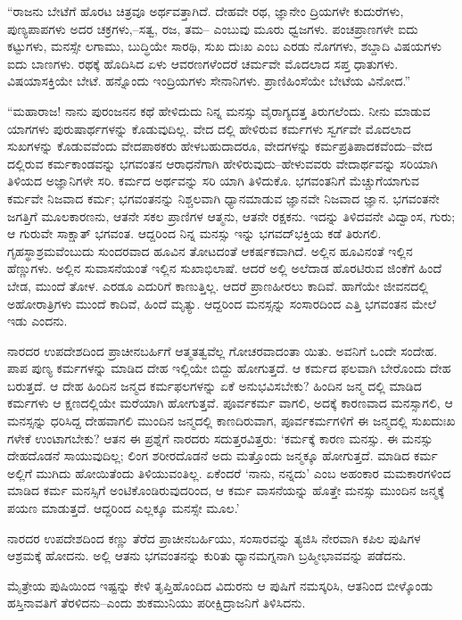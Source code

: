 “ರಾಜನು ಬೇಟೆಗೆ ಹೊರಟ ಚಿತ್ರವೂ ಅರ್ಥವತ್ತಾಗಿದೆ. ದೇಹವೇ ರಥ, ಜ್ಞಾನೇಂ ದ್ರಿಯಗಳೇ ಕುದುರೆಗಳು, ಪುಣ್ಯಪಾಪಗಳು ಅದರ ಚಕ್ರಗಳು,–ಸತ್ವ, ರಜ, ತಮ– ಎಂಬುವು ಮೂರು ಧ್ವಜಗಳು. ಪಂಚಪ್ರಾಣಗಳೇ ಐದು ಕಟ್ಟುಗಳು, ಮನಸ್ಸೇ ಲಗಾಮು, ಬುದ್ಧಿಯೇ ಸಾರಥಿ, ಸುಖ ದುಃಖ ಎಂಬ ಎರಡು ನೊಗಗಳು, ಶಬ್ದಾದಿ ವಿಷಯಗಳು ಐದು ಬಾಣಗಳು. ರಥಕ್ಕೆ ಹೊದಿಸಿದ ಏಳು ಆವರಣಗಳೆಂದರೆ ಚರ್ಮವೇ ಮೊದಲಾದ ಸಪ್ತ ಧಾತುಗಳು. ವಿಷಯಾಸಕ್ತಿಯೇ ಬೇಟೆ. ಹನ್ನೊಂದು ಇಂದ್ರಿಯಗಳು ಸೇನಾನಿಗಳು. ಪ್ರಾಣಿಹಿಂಸೆಯೇ ಬೇಟೆಯ ವಿನೋದ.”

“ಮಹಾರಾಜ! ನಾನು ಪುರಂಜನನ ಕಥೆ ಹೇಳಿದುದು ನಿನ್ನ ಮನಸ್ಸು ವೈರಾಗ್ಯದತ್ತ ತಿರುಗಲೆಂದು. ನೀನು ಮಾಡುವ ಯಾಗಗಳು ಪುರುಷಾರ್ಥಗಳನ್ನು ಕೊಡುವುದಿಲ್ಲ. ವೇದ ದಲ್ಲಿ ಹೇಳಿರುವ ಕರ್ಮಗಳು ಸ್ವರ್ಗವೇ ಮೊದಲಾದ ಸುಖಗಳನ್ನು ಕೊಡುವವೆಂದು ವೇದಪಾಠಕರು ಹೇಳಬಹುದಾದರೂ, ವೇದಗಳನ್ನು ಕರ್ಮಪ್ರತಿಪಾದಕವೆಂದು–ವೇದ ದಲ್ಲಿರುವ ಕರ್ಮಕಾಂಡವನ್ನು ಭಗವಂತನ ಆರಾಧನೆಗಾಗಿ ಹೇಳಿರುವುದು–ಹೇಳುವವರು ವೇದಾರ್ಥವನ್ನು ಸರಿಯಾಗಿ ತಿಳಿಯದ ಅಜ್ಞಾನಿಗಳೇ ಸರಿ. ಕರ್ಮದ ಅರ್ಥವನ್ನು ಸರಿ ಯಾಗಿ ತಿಳಿದುಕೊ. ಭಗವಂತನಿಗೆ ಮೆಚ್ಚುಗೆಯಾಗುವ ಕರ್ಮವೇ ನಿಜವಾದ ಕರ್ಮ; ಭಗವಂತನನ್ನು ನಿಶ್ಚಲವಾಗಿ ಧ್ಯಾನಮಾಡುವ ಜ್ಞಾನವೇ ನಿಜವಾದ ಜ್ಞಾನ. ಭಗವಂತನೇ ಜಗತ್ತಿಗೆ ಮೂಲಕಾರಣನು, ಆತನೇ ಸಕಲ ಪ್ರಾಣಿಗಳ ಆತ್ಮನು, ಆತನೇ ರಕ್ಷಕನು. ಇದನ್ನು ತಿಳಿದವನೇ ವಿದ್ವಾಂಸ, ಗುರು; ಆ ಗುರುವೇ ಸಾಕ್ಷಾತ್ ಭಗವಂತ. ಆದ್ದರಿಂದ ನಿನ್ನ ಮನಸ್ಸು ಇನ್ನು ಭಗವದ್​ಭಕ್ತಿಯ ಕಡೆ ತಿರುಗಲಿ. ಗೃಹಸ್ಥಾಶ್ರಮವೆಂಬುದು ಸುಂದರವಾದ ಹೂವಿನ ತೋಟದಂತೆ ಆಕರ್ಷಕವಾಗಿದೆ. ಅಲ್ಲಿನ ಹೂವಿನಂತೆ ಇಲ್ಲಿನ ಹೆಣ್ಣುಗಳು. ಅಲ್ಲಿನ ಸುವಾಸನೆಯಂತೆ ಇಲ್ಲಿನ ಸುಖಾಭಿಲಾಷೆ. ಆದರೆ ಅಲ್ಲಿ ಅಲೆದಾಡ ಹೊರಟಿರುವ ಜಿಂಕೆಗೆ ಹಿಂದೆ ಬೇಡ, ಮುಂದೆ ತೋಳ. ಎರಡೂ ಎದುರಿಗೆ ಕಾಣುತ್ತಿಲ್ಲ. ಆದರೆ ಪ್ರಾಣಹೀರಲು ಕಾದಿವೆ. ಹಾಗೆಯೇ ಜೀವನದಲ್ಲಿ ಅಹೋರಾತ್ರಿಗಳು ಮುಂದೆ ಕಾದಿವೆ, ಹಿಂದೆ ಮೃತ್ಯು. ಆದ್ದರಿಂದ ಮನಸ್ಸನ್ನು ಸಂಸಾರದಿಂದ ಎತ್ತಿ ಭಗವಂತನ ಮೇಲೆ ಇಡು ಎಂದನು.

ನಾರದರ ಉಪದೇಶದಿಂದ ಪ್ರಾಚೀನಬರ್ಹಿಗೆ ಆತ್ಮತತ್ವವೆಲ್ಲ ಗೋಚರವಾದಂತಾ ಯಿತು. ಅವನಿಗೆ ಒಂದೇ ಸಂದೇಹ. ಪಾಪ ಪುಣ್ಯ ಕರ್ಮಗಳನ್ನು ಮಾಡಿದ ದೇಹ ಇಲ್ಲಿಯೇ ಬಿದ್ದು ಹೋಗುತ್ತದೆ. ಆ ಕರ್ಮದ ಫಲವಾಗಿ ಬೇರೊಂದು ದೇಹ ಬರುತ್ತದೆ. ಆ ದೇಹ ಹಿಂದಿನ ಜನ್ಮದ ಕರ್ಮಫಲಗಳನ್ನು ಏಕೆ ಅನುಭವಿಸಬೇಕು? ಹಿಂದಿನ ಜನ್ಮ ದಲ್ಲಿ ಮಾಡಿದ ಕರ್ಮಗಳು ಆ ಕ್ಷಣದಲ್ಲಿಯೇ ಮರೆಯಾಗಿ ಹೋಗುತ್ತವೆ. ಪೂರ್ವಕರ್ಮ ವಾಗಲಿ, ಅದಕ್ಕೆ ಕಾರಣವಾದ ಮನಸ್ಸಾಗಲಿ, ಆ ಮನಸ್ಸನ್ನು ಧರಿಸಿದ್ದ ದೇಹವಾಗಲಿ ಮುಂದಿನ ಜನ್ಮದಲ್ಲಿ ಕಾಣದಿರುವಾಗ, ಪೂರ್ವಕರ್ಮಗಳಿಗೆ ಈ ಜನ್ಮದಲ್ಲಿ ಸುಖದುಃಖ ಗಳೇಕೆ ಉಂಟಾಗಬೇಕು? ಆತನ ಈ ಪ್ರಶ್ನೆಗೆ ನಾರದರು ಸದುತ್ತರವಿತ್ತರು: ‘ಕರ್ಮಕ್ಕೆ ಕಾರಣ ಮನಸ್ಸು. ಈ ಮನಸ್ಸು ದೇಹದೊಡನೆ ಸಾಯುವುದಿಲ್ಲ; ಲಿಂಗ ಶರೀರದೊಡನೆ ಅದು ಮತ್ತೊಂದು ಜನ್ಮಕ್ಕೂ ಹೋಗುತ್ತದೆ. ಮಾಡಿದ ಕರ್ಮ ಅಲ್ಲಿಗೆ ಮುಗಿದು ಹೋಯಿತೆಂದು ತಿಳಿಯುವಂತಿಲ್ಲ. ಏಕೆಂದರೆ ‘ನಾನು, ನನ್ನದು’ ಎಂಬ ಅಹಂಕಾರ ಮಮಕಾರಗಳಿಂದ ಮಾಡಿದ ಕರ್ಮ ಮನಸ್ಸಿಗೆ ಅಂಟಿಕೊಂಡಿರುವುದರಿಂದ, ಆ ಕರ್ಮ ವಾಸನೆಯನ್ನು ಹೊತ್ತೇ ಮನಸ್ಸು ಮುಂದಿನ ಜನ್ಮಕ್ಕೆ ಪಯಣ ಮಾಡುತ್ತದೆ. ಆದ್ದರಿಂದ ಎಲ್ಲಕ್ಕೂ ಮನಸ್ಸೇ ಮೂಲ.’

ನಾರದರ ಉಪದೇಶದಿಂದ ಕಣ್ಣು ತೆರೆದ ಪ್ರಾಚೀನಬರ್ಹಿಯು, ಸಂಸಾರವನ್ನು ತ್ಯಜಿಸಿ ನೇರವಾಗಿ ಕಪಿಲ ಪುಷಿಗಳ ಆಶ್ರಮಕ್ಕೆ ಹೋದನು. ಅಲ್ಲಿ ಆತನು ಭಗವಂತನನ್ನು ಕುರಿತು ಧ್ಯಾನಮಗ್ನನಾಗಿ ಬ್ರಹ್ಮೀಭಾವವನ್ನು ಪಡೆದನು.

ಮೈತ್ರೇಯ ಪುಷಿಯಿಂದ ಇಷ್ಟನ್ನು ಕೇಳಿ ತೃಪ್ತಿಹೊಂದಿದ ವಿದುರನು ಆ ಪುಷಿಗೆ ನಮಸ್ಕರಿಸಿ, ಆತನಿಂದ ಬೀಳ್ಕೊಂಡು ಹಸ್ತಿನಾವತಿಗೆ ತೆರಳಿದನು–ಎಂದು ಶುಕಮುನಿಯು ಪರೀಕ್ಷಿದ್ರಾಜನಿಗೆ ತಿಳಿಸಿದನು.

